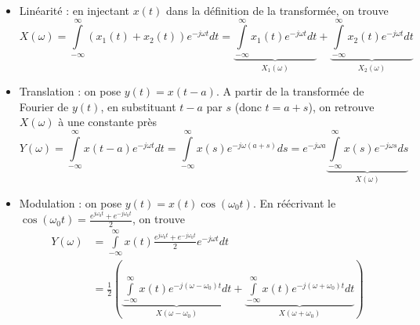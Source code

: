 \documentclass [a4paper, 11pt] {article}
\begin{document}
    \begin{reponse}
        \begin{itemize}
            \item Linéarité : en injectant $x(t)$ dans la définition de la transformée, on trouve
            \begin{equation}
                X(\omega)= \int\limits_{-\infty}^\infty (x_1(t)+x_2(t)) e^{-j\omega t} dt = \underbrace{\int\limits_{-\infty}^\infty x_1(t) e^{-j\omega t} dt}_{X_1(\omega)} + \underbrace{\int\limits_{-\infty}^\infty x_2(t) e^{-j\omega t} dt}_{X_2(\omega)} 
            \end{equation}
            \item Translation : on pose $y(t)=x(t-a)$. A partir de la transformée de Fourier de $y(t)$, en substituant $t-a$ par $s$ (donc $t=a+s$), on retrouve $X(\omega)$ à une constante près
            \begin{equation}
                Y(\omega)= \int\limits_{-\infty}^{\infty} x(t-a) e^{-j\omega t} dt = \int\limits_{-\infty}^{\infty} x(s) e^{-j\omega (a+s)} ds =  e^{-j\omega a} \underbrace{\int\limits_{-\infty}^{\infty} x(s) e^{-j\omega s} ds}_{X(\omega)}
            \end{equation}
            \item Modulation : on pose $y(t)=x(t)\cos(\omega_0 t)$. En réécrivant le $\cos(\omega_0 t)=\frac{e^{j\omega_0 t}+e^{-j\omega_0 t}}{2}$, on trouve
            \begin{align}
                Y(\omega) &= \int\limits_{-\infty}^\infty x(t)\frac{e^{j\omega_0 t}+e^{-j\omega_0 t}}{2}e^{-j\omega t} dt \\
                &= \frac{1}{2}\left(\underbrace{\int\limits_{-\infty}^\infty x(t) e^{-j(\omega-\omega_0) t} dt}_{X(\omega-\omega_0)} + \underbrace{\int\limits_{-\infty}^\infty x(t) e^{-j(\omega+\omega_0) t} dt}_{X(\omega+\omega_0)} \right)
            \end{align}
        \end{itemize}
    \end{reponse}
    
\end{document}
